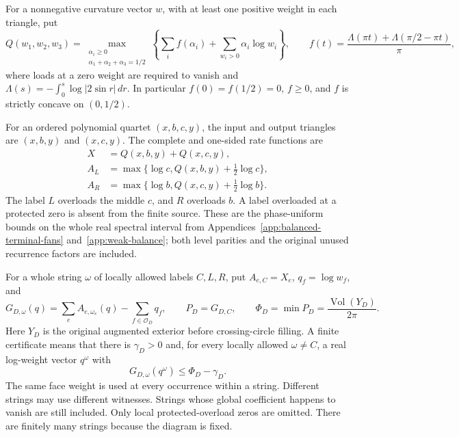 For a nonnegative curvature vector \(w\), with at least one positive weight in each triangle, put
\begin{equation}\label{tbi:eq-1}
Q(w_1,w_2,w_3)=
\max_{\substack{\alpha_i\ge0\\\alpha_1+\alpha_2+\alpha_3=1/2}}
\left\{\sum_i f(\alpha_i)+\sum_{w_i>0}\alpha_i\log w_i\right\},
\qquad
f(t)=\frac{\Lambda(\pi t)+\Lambda(\pi/2-\pi t)}{\pi},
\end{equation}
where loads at a zero weight are required to vanish and
\(\Lambda(s)=-\int_0^s\log|2\sin r|\,dr\). In particular \(f(0)=f(1/2)=0\), \(f\ge0\), and \(f\) is strictly concave on \((0,1/2)\).

For an ordered polynomial quartet \((x,b,c,y)\), the input and output triangles are \((x,b,y)\) and \((x,c,y)\). The complete and one-sided rate functions are
\begin{equation}\label{tbi:eq-C1}
\begin{aligned}
X&=Q(x,b,y)+Q(x,c,y),\\
A_L&=\max\{\log c,Q(x,b,y)+\tfrac12\log c\},\\
A_R&=\max\{\log b,Q(x,c,y)+\tfrac12\log b\}.
\end{aligned}
\end{equation}
The label \(L\) overloads the middle \(c\), and \(R\) overloads \(b\). A label overloaded at a protected zero is absent from the finite source. These are the phase-uniform bounds on the whole real spectral interval from Appendices~\ref{app:balanced-terminal-fans} and~\ref{app:weak-balance}; both level parities and the original unused recurrence factors are included.

For a whole string \(\omega\) of locally allowed labels \(C,L,R\), put \(A_{e,C}=X_e\), \(q_f=\log w_f\), and
\begin{equation}\label{tbi:eq-C2a}
G_{D,\omega}(q)=\sum_e A_{e,\omega_e}(q)-\sum_{f\in\mathcal O_D}q_f,
\qquad P_D=G_{D,C},\qquad
\Phi_D=\min P_D=\frac{\operatorname{Vol}(Y_D)}{2\pi}.
\end{equation}
Here \(Y_D\) is the original augmented exterior before crossing-circle filling. A finite certificate means that there is \(\gamma_D>0\) and, for every locally allowed \(\omega\ne C\), a real log-weight vector \(q^\omega\) with
\begin{equation}\label{tbi:eq-C2}
G_{D,\omega}(q^\omega)\le\Phi_D-\gamma_D.
\end{equation}
The same face weight is used at every occurrence within a string. Different strings may use different witnesses. Strings whose global coefficient happens to vanish are still included. Only local protected-overload zeros are omitted. There are finitely many strings because the diagram is fixed.

